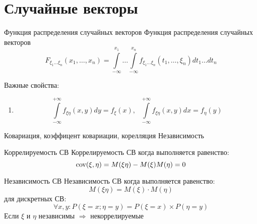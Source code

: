 \documentclass[12pt]{article}
\begin{document}
\newpage
\section{Случайные векторы}

\begin{definition}
    {Функция распределения случайных векторов}
    {Функция распределения случайных векторов}
    \begin{displaymath}
        F_{\xi_{1}\ldots \xi_{n}}(x_{1},\ldots,x_{n})
        =\int\limits_{-\infty}^{x_{1}}\ldots\int\limits_{-\infty}^{x_{n}}
        f_{\xi_{1}\ldots\xi_{n}}(t_{1},\ldots,\xi_{n})dt_{1}\ldots dt_{n}
    \end{displaymath}
\end{definition}

\par Важные свойства:
\begin{enumerate}
    \item \begin{displaymath}
            \int\limits_{-\infty}^{+\infty}f_{\xi\eta}(x,y)dy=f_{\xi}(x),
            \ \ \ \int\limits_{-\infty}^{+\infty}f_{\xi\eta}(x,y)dx=f_{\eta}(y)
        \end{displaymath}
\end{enumerate}

Ковариация, коэффицент ковариации, корелляция
Независимость

\begin{definition}
    {Коррелируемость СВ}
    {Коррелируемость СВ}
    когда выполняется равенство:
    \begin{displaymath}
        \textmd{cov}(\xi,\eta)=M(\xi\eta)-M(\xi)M(\eta)=0
    \end{displaymath}
\end{definition}

\begin{definition}
    {Независимость СВ}
    {Независимость СВ}
    когда выполняется равенство:
    \begin{displaymath}
        M(\xi\eta)=M(\xi)\cdot M(\eta)
    \end{displaymath}
    для дискретных СВ:
    \begin{displaymath}
        \forall x,y: P(\xi=x;\eta=y)=P(\xi=x)\times P(\eta=y)
    \end{displaymath}
    Если $\xi$ и $\eta$ независимы $ \Rightarrow $ некоррелируемые
\end{definition}
\end{document}
